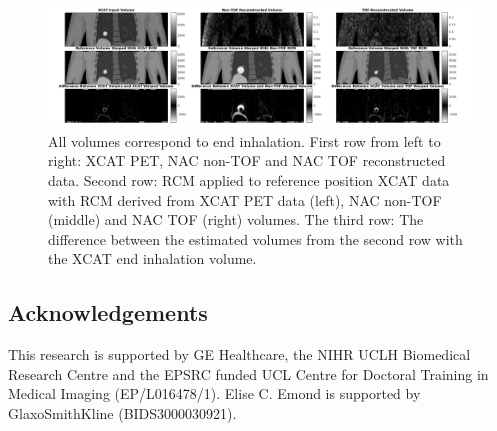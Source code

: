 \documentclass[portrait,color=UCLburgundy,margin=2cm]{uclposter}
\begin{document}
\begin{figure}[h!]
  \centering
  \includegraphics[width=1\linewidth]{output.png}
  
  \begin{highlightbox}[UCLlightblue]
      \caption{All volumes correspond to end inhalation. First row from left to right: XCAT PET, NAC non-TOF and NAC TOF reconstructed data. Second row: RCM applied to reference position XCAT data with RCM derived from XCAT PET data (left), NAC non-TOF (middle) and NAC TOF (right) volumes. The third row: The difference between the estimated volumes from the second row with the XCAT end inhalation volume.}
  \end{highlightbox}
  
  \label{fig:output}
\end{figure}

\begin{multicols}{2}

\AtNextBibliography{\footnotesize}
\printbibliography

\footnotesize
\section*{Acknowledgements}
This research is supported by GE Healthcare, the NIHR UCLH Biomedical Research Centre and the EPSRC funded UCL Centre for Doctoral Training in Medical Imaging (EP/L016478/1).
Elise C. Emond is supported by GlaxoSmithKline (BIDS3000030921).

\end{multicols}
\end{document}
